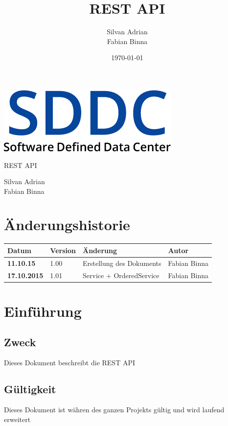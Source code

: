 \documentclass[11pt]{scrartcl}
\title{REST API}
\author{Silvan Adrian \\ Fabian Binna}
\date{\today{}}
\begin{document}
\def\arraystretch{1.5}
\begin{titlepage}
\begin{center}
\vspace{10em}
\includegraphics[scale=2]{SDDC}
\vspace{10em}
\end{center}
\begin{center}
\huge {REST API}
\end{center}
\begin{center}
\vspace{10em}
\LARGE {Silvan Adrian} \\
\LARGE {Fabian Binna}
\end{center}

\end{titlepage}

\newpage
\section{Änderungshistorie}
\begin{tabularx}{\linewidth}{l l X l}
\textbf{Datum} & \textbf{Version} & \textbf{Änderung}  & \textbf{Autor} \\
\hline
\textbf{11.10.15} & 1.00 & Erstellung des Dokuments & Fabian Binna \\
\textbf{17.10.2015} & 1.01 & Service + OrderedService & Fabian Binna\\

\end{tabularx}

\newpage
\tableofcontents
\newpage

\section{Einführung}
\subsection{Zweck}
Dieses Dokument beschreibt die REST API
\subsection{Gültigkeit}
Dieses Dokument ist währen des ganzen Projekts gültig und wird laufend erweitert
\end{document}
